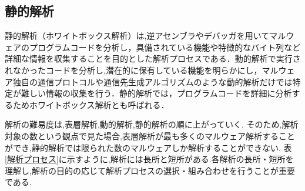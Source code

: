 \documentclass{thesis}
\begin{document}
\subsection*{静的解析}
静的解析（ホワイトボックス解析）は,逆アセンブラやデバッガを用いてマルウェアのプログラムコードを分析し，具備されている機能や特徴的なバイト列など詳細な情報を収集することを目的とした解析プロセスである．動的解析で実行されなかったコードを分析し,潜在的に保有している機能を明らかにし，マルウェア独自の通信プロトコルや通信先生成アルゴリズムのような動的解析だけでは特定が難しい情報の収集を行う．静的解析では，プログラムコードを詳細に分析するためホワイトボックス解析とも呼ばれる．


解析の難易度は,表層解析,動的解析,静的解析の順に上がっていく.
そのため,解析対象の数という観点で見た場合,表層解析が最も多くのマルウェア解析することができ,静的解析では限られた数のマルウェアしか解析することができない.
表\ref{解析プロセス}に示すように,解析には長所と短所がある.各解析の長所・短所を理解し,解析の目的の応じて解析プロセスの選択・組み合わせを行うことが重要である.
\end{document}
